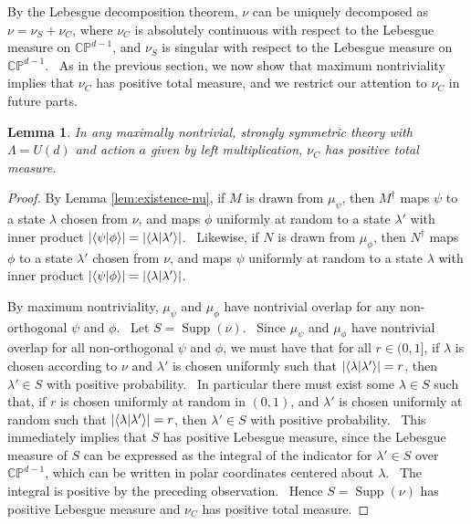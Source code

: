 \documentclass[letterpaper,11pt]{article}
\newtheorem{lem}{Lemma}
\newcommand{\braket}[2]{\mbox{$ \langle #1 | #2 \rangle $}}
\DeclareMathOperator{\supp}{Supp}
\begin{document}
By the Lebesgue decomposition theorem, $\nu$ can be uniquely decomposed as $\nu = \nu_S + \nu_C$, where $\nu_C$ is absolutely continuous with respect to the Lebesgue measure on $\mathbb{CP}^{d-1}$, and $\nu_S$ is singular with respect to the Lebesgue measure on $\mathbb{CP}^{d-1}$. \ As in the previous section, we now show that maximum nontriviality implies that $\nu_C$ has positive total measure, and we restrict our attention to $\nu_C$ in future parts.

\begin{lem}
\label{lem:nu-C-nontrivial}
In any maximally nontrivial, strongly symmetric theory with $\Lambda=U(d)$ and action $a$ given by left multiplication, $\nu_C$ has positive total measure.

\end{lem}
\begin{proof}


By Lemma \ref{lem:existence-nu}, if $M$ is drawn from $\mu_\psi$, then $M^\dagger$ maps $\psi$ to a state $\lambda$ chosen from $\nu$, and maps $\phi$ uniformly at random to a state $\lambda'$ with inner product $|\braket{\psi}{\phi}|=|\braket{\lambda}{\lambda'}|$. \ Likewise, if $N$ is drawn from $\mu_\phi$, then $N^\dagger$ maps $\phi$ to a state $\lambda'$ chosen from $\nu$, and maps $\psi$ uniformly at random to a state $\lambda$ with inner product $|\braket{\psi}{\phi}|=|\braket{\lambda}{\lambda'}|$.

By maximum nontriviality, $\mu_\psi$ and $\mu_\phi$ have nontrivial overlap for any non-orthogonal $\psi$ and $\phi$. \ Let $S=\supp(\nu)$. \ Since $\mu_\psi$ and $\mu_\phi$ have nontrivial overlap for all non-orthogonal $\psi$ and $\phi$, we must have that for all $r\in(0,1]$, if $\lambda$ is chosen according to $\nu$ and $\lambda'$ is chosen uniformly such that $|\braket{\lambda}{\lambda'}|=r$, then $\lambda' \in S$ with positive probability. \ In particular there must exist some $\lambda \in S$ such that, if $r$ is chosen uniformly at random in $(0,1)$, and $\lambda'$ is chosen uniformly at random such that $|\braket{\lambda}{\lambda'}|=r$, then $\lambda' \in S$ with positive probability. \ This immediately implies that $S$ has positive Lebesgue measure, since the Lebesgue measure of $S$ can be expressed as the integral of the indicator for $\lambda' \in S$ over $\mathbb{CP}^{d-1}$, which can be written in polar coordinates centered about $\lambda$. \ The integral is positive by the preceding observation. \ Hence $S=\supp(\nu)$ has positive Lebesgue measure and $\nu_C$ has positive total measure.

\end{proof}
\end{document}

